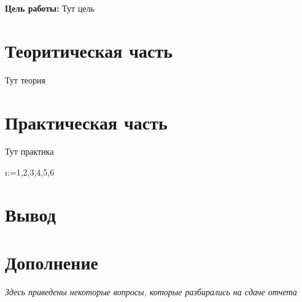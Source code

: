 



\def\labauthors{Понур К.А., Хавьер, Шиков А.П.}
\def\labgroup{450}
\def\labnumber{1}
\def\labtheme{Согласованные фильтры}


\newpage

{\bfseries Цель работы:} 
Тут цель

\section{Теоритическая часть}
Тут теория

\newpage
\section{Практическая часть}
Тут практика

\makeatletter
\@for\i:={1,2,3,4,5,6}\do{}
\makeatother

\section{Вывод}


\newpage
\section{Дополнение}
\textit{Здесь приведены некоторые вопросы, которые разбирались на сдаче отчета}



